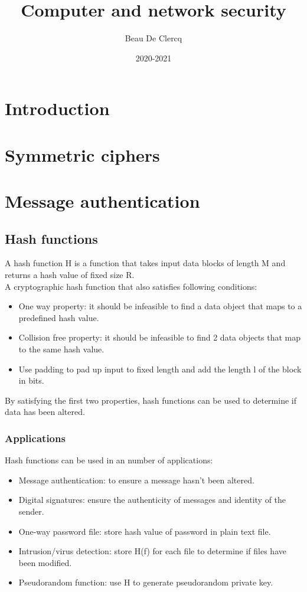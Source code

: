 \documentclass[12pt]{article}
\title{Computer and network security}
\author{Beau De Clercq}
\date{2020-2021}
\begin{document}
	
 \maketitle{}
 
 \tableofcontents
 
 \clearpage
 \newpage
 
 \section{Introduction}
 
 \section{Symmetric ciphers}
 
 \newpage
 \section{Message authentication}
 \subsection{Hash functions}
 A hash function H is a function that takes input data blocks of length M and returns a hash value of fixed size R.\\
 A cryptographic hash function that also satisfies following conditions:
 \begin{itemize}
 	\item One way property: it should be infeasible to find a data object that maps to a predefined hash value.
 	\item Collision free property: it should be infeasible to find 2 data objects that map to the same hash value.
 	\item Use padding to pad up input to fixed length and add the length l of the block in bits. 
 \end{itemize}
By satisfying the first two properties, hash functions can  be used to determine if data has been altered.
\subsubsection{Applications}
Hash functions can be used in an number of applications:
\begin{itemize}
	\item Message authentication: to ensure a message hasn't been altered.
	\item Digital signatures: ensure the authenticity of messages and identity of the sender.
	\item One-way password file: store hash value of password in plain text file.
	\item Intrusion/virus detection: store H(f) for each file to determine if files have been modified.
	\item Pseudorandom function: use H to generate pseudorandom private key.
\end{itemize}
\end{document}
